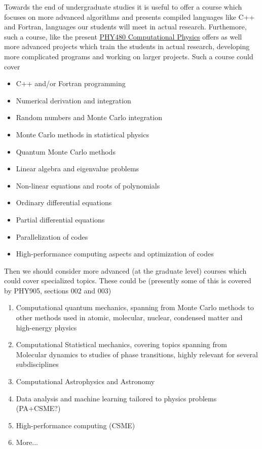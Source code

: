 \documentclass[%
oneside,                 %
final,                   %
10pt]{article}
\begin{document}
Towards the end of undergraduate studies it is useful to offer a course which focuses on more advanced algorithms and presents compiled languages like C++ and Fortran, languages our students will meet in actual research.
Furthemore, such a course, like the present \href{{https://github.com/CompPhysics/ComputationalPhysicsMSU}}{PHY480 Computational Physics} offers as well more advanced projects which train the students in actual research, developing more complicated programs and working on larger projects.
Such a course could cover
\begin{itemize}
  \item C++ and/or Fortran programming

  \item Numerical derivation and integration

  \item Random numbers and Monte Carlo integration

  \item Monte Carlo methods in statistical physics

  \item Quantum Monte Carlo methods

  \item Linear algebra and eigenvalue problems

  \item Non-linear equations and roots of polynomials

  \item Ordinary differential equations

  \item Partial differential equations

  \item Parallelization of codes

  \item High-performance computing aspects and optimization of codes
\end{itemize}

\noindent
Then we should consider more advanced (at the graduate level) courses which could cover specialized topics. 
These could be (presently some of this is covered by PHY905, sections 002 and 003)
\begin{enumerate}
  \item Computational quantum mechanics, spanning from Monte Carlo methods to other methods used in atomic, molecular, nuclear, condensed matter and high-energy physics

  \item Computational Statistical mechanics, covering topics spanning from Molecular dynamics to studies of phase transitions, highly relevant for several subdisciplines

  \item Computational Astrophysics and Astronomy

  \item Data analysis and machine learning tailored to physics problems (PA+CSME?)

  \item High-performance computing (CSME)

  \item More...
\end{enumerate}
\end{document}
